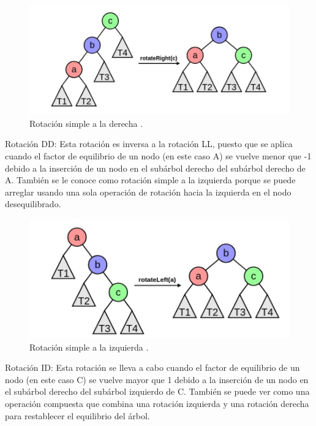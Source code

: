 \documentclass[journal]{IEEEtran}
\begin{document}
\begin{figure}[H]
    \centering
    \includegraphics[scale=0.7]{LL rotation.PNG}
    \captionsetup{justification=centering}  %
    \caption{Rotación simple a la derecha \cite{Algoritmos y Programación}.}
    \label{fig:enter-label}

\end{figure}

Rotación DD: Esta rotación es inversa a la rotación LL, puesto que se aplica cuando el factor de equilibrio de un nodo (en este caso A) se vuelve menor que -1 debido a la inserción de un nodo en el subárbol derecho del subárbol derecho de A. También se le conoce como rotación simple a la izquierda porque se puede arreglar usando una sola operación de rotación hacia la izquierda en el nodo desequilibrado.

\begin{figure}[H]
    \centering
    \includegraphics[scale=0.7]{RR rotation.PNG}
    \captionsetup{justification=centering}  %
    \caption{Rotación simple a la izquierda \cite{Algoritmos y Programación}.}
    \label{fig:enter-label}
\end{figure}

Rotación ID: Esta rotación se lleva a cabo cuando el factor de equilibrio de un nodo (en este caso C) se vuelve mayor que 1 debido a la inserción de un nodo en el subárbol derecho del subárbol izquierdo de C. También se puede ver como una operación compuesta que combina una rotación izquierda y una rotación derecha para restablecer el equilibrio del árbol.
\end{document}
